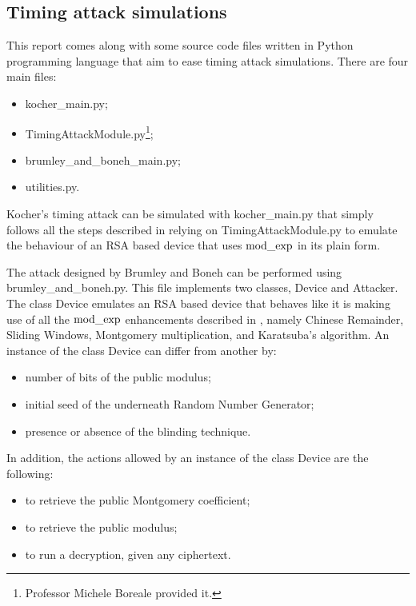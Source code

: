 \subsection{Timing attack simulations}

This report comes along with some source code files written in Python programming language that aim to ease timing attack simulations.
There are four main files:
\begin{itemize}
  \item kocher\_main.py;
  \item TimingAttackModule.py\footnote{Professor Michele Boreale provided it.};
  \item brumley\_and\_boneh\_main.py;
  \item utilities.py.
\end{itemize}

Kocher's timing attack can be simulated with kocher\_main.py that simply follows all the steps described in  relying on TimingAttackModule.py to emulate the behaviour of an RSA based device that uses $\operatorname{mod\_exp}$ in its plain form.

The attack designed by Brumley and Boneh can be performed using brumley\_and\_boneh.py. This file implements two classes, Device and Attacker.
The class Device emulates an RSA based device that behaves like it is making use of all the $\operatorname{mod\_exp}$ enhancements described in , namely Chinese Remainder, Sliding Windows, Montgomery multiplication, and Karatsuba's algorithm.
An instance of the class Device can differ from another by:

\begin{itemize}
  \item number of bits of the public modulus;
  \item initial seed of the underneath Random Number Generator;
  \item presence or absence of the blinding technique.
\end{itemize}

In addition, the actions allowed by an instance of the class Device are the following:

\begin{itemize}
  \item to retrieve the public Montgomery coefficient;
  \item to retrieve the public modulus;
  \item to run a decryption, given any ciphertext.
\end{itemize}

